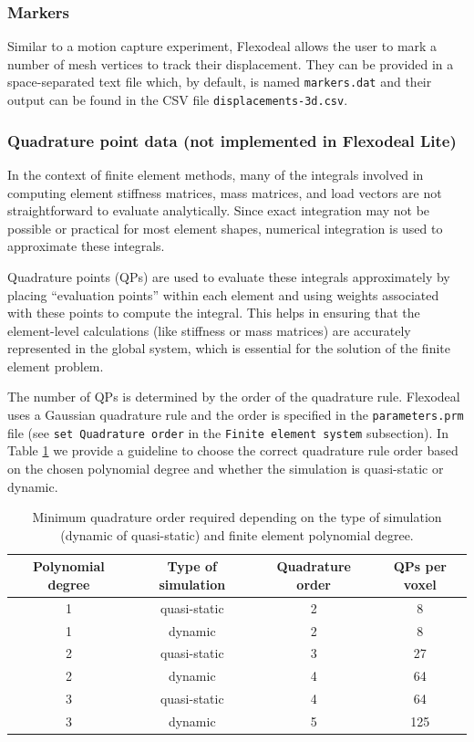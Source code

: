 \documentclass{sfuthesis}
\numberwithin{equation}{section}
\numberwithin{figure}{chapter}
\numberwithin{table}{chapter}
\theoremstyle{definition}
\begin{document}
\subsubsection{Markers}

Similar to a motion capture experiment, Flexodeal allows the user to mark a number of mesh vertices to track their displacement. They can be provided in a space-separated text file which, by default, is named \texttt{markers.dat} and their output can be found in the CSV file \texttt{displacements-3d.csv}.

\subsubsection{Quadrature point data (not implemented in Flexodeal Lite)} 

In the context of finite element methods, many of the integrals involved in computing element stiffness matrices, mass matrices, and load vectors are not straightforward to evaluate analytically. Since exact integration may not be possible or practical for most element shapes, numerical integration is used to approximate these integrals.

Quadrature points (QPs) are used to evaluate these integrals approximately by placing ``evaluation points'' within each element and using weights associated with these points to compute the integral. This helps in ensuring that the element-level calculations (like stiffness or mass matrices) are accurately represented in the global system, which is essential for the solution of the finite element problem.

The number of QPs is determined by the order of the quadrature rule. Flexodeal uses a Gaussian quadrature rule and the order is specified in the \texttt{parameters.prm} file (see \texttt{set Quadrature order} in the \texttt{Finite element system} subsection). In Table \ref{tab:number_of_qp_points}  we provide a guideline to choose the correct quadrature rule order based on the chosen polynomial degree and whether the simulation is quasi-static or dynamic.

\begin{table}
    \centering
    \begin{tabular}{|c|c|c|c|}\hline
        Polynomial degree & Type of simulation & Quadrature order & QPs per voxel \\\hline
        1 & quasi-static & 2 & 8 \\\hline
        1 & dynamic & 2 & 8 \\\hline
        2 & quasi-static & 3 & 27 \\\hline
        2 & dynamic & 4 & 64 \\\hline
        3 & quasi-static & 4 & 64 \\\hline
        3 & dynamic & 5 & 125 \\\hline
    \end{tabular}
    \caption{Minimum quadrature order required depending on the type of simulation (dynamic of quasi-static) and finite element polynomial degree.\label{tab:number_of_qp_points}}
\end{table}
\end{document}

